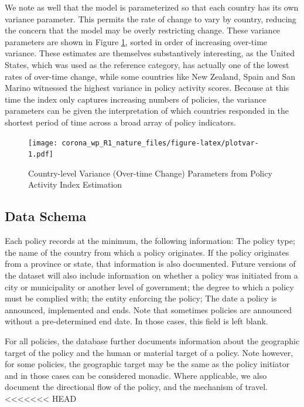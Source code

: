 \documentclass[]{article}
\begin{document}
We note as well that the model is parameterized so that each country has its own variance parameter. This permits the rate of change to vary by country, reducing the concern that the model may be overly restricting change. These variance parameters are shown in Figure \ref{fig:plotvar}, sorted in order of increasing over-time variance. These estimates are themselves substantively interesting, as the United States, which was used as the reference category, has actually one of the lowest rates of over-time change, while some countries like New Zealand, Spain and San Marino witnessed the highest variance in policy activity scores. Because at this time the index only captures increasing numbers of policies, the variance parameters can be given the interpretation of which countries responded in the shortest period of time across a broad array of policy indicators.

\begin{figure}
\centering
\texttt{[image: corona\_wp\_R1\_nature\_files/figure-latex/plotvar-1.pdf]}
\caption{\label{fig:plotvar}Country-level Variance (Over-time Change) Parameters from Policy Activity Index Estimation}
\end{figure}

\hypertarget{data-schema}{%
\subsection*{Data Schema}\label{data-schema}}

Each policy records at the minimum, the following information: The policy type; the name of the country from which a policy originates. If the policy originates from a province or state, that information is also documented. Future versions of the dataset will also include information on whether a policy was initiated from a city or municipality or another level of government; the degree to which a policy must be complied with; the entity enforcing the policy; The date a policy is announced, implemented and ends. Note that sometimes policies are announced without a pre-determined end date. In those cases, this field is left blank.

For all policies, the database further documents information about the geographic target of the policy and the human or material target of a policy. Note however, for some policies, the geographic target may be the same as the policy initiator and in those cases can be considered monadic. Where applicable, we also document the directional flow of the policy, and the mechanism of travel.
<<<<<<< HEAD
\end{document}
